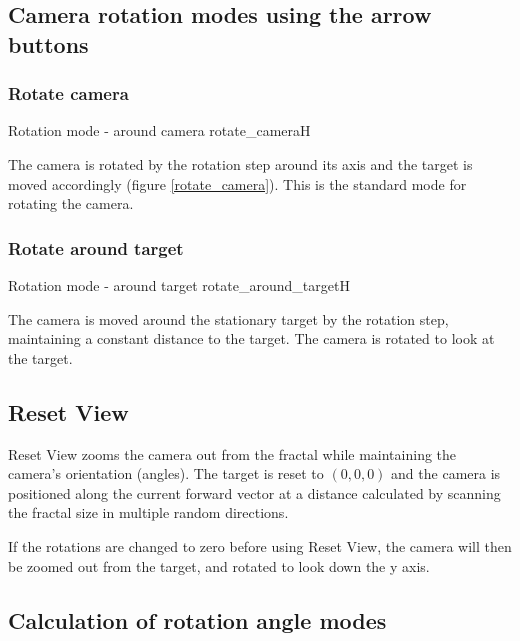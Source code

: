 \subsection{Camera rotation modes using the arrow buttons}\label{camera-rotation-modes-using-the-arrow-buttons}

\subsubsection{Rotate camera}\label{rotate-camera}

{Rotation mode - around camera}
{rotate_camera}{H}

The camera is rotated by the rotation step around its axis and the target is
moved accordingly (figure \ref{rotate_camera}). This is the standard mode for rotating the camera.

\subsubsection{Rotate around target}\label{rotate-around-target}

{Rotation mode - around target}
{rotate_around_target}{H}

The camera is moved around the stationary target by the rotation step,
maintaining a constant distance to the target. The camera is rotated to look at
the target.

\subsection{Reset View}\label{reset-view}

Reset View zooms the camera out from the fractal while maintaining the camera's orientation (angles). The target is reset to $(0, 0, 0)$ and the camera is positioned along the current forward vector at a distance calculated by scanning the fractal size in multiple random directions.

If the rotations are changed to zero before using Reset View, the camera will
then be zoomed out from the target, and rotated to look down the y axis.

\subsection{Calculation of rotation angle modes}\label{calculation-of-rotation-angle-modes}

